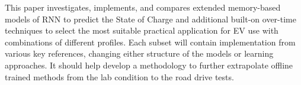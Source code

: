 %
%
%
%
%
 {
    This paper investigates, implements, and compares extended memory-based models of RNN to predict the State of Charge and additional built-on over-time techniques to select the most suitable practical application for EV use with combinations of different profiles.
}
Each subset will contain implementation from various key references, changing either structure of the models or learning approaches.
It should help develop a methodology to further extrapolate offline trained methods from the lab condition to the road drive tests.
